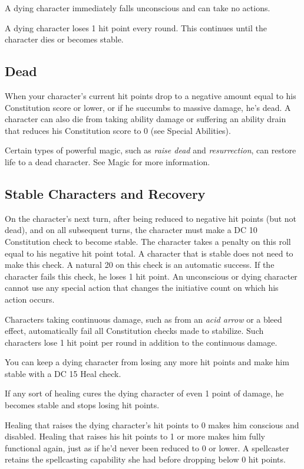 A dying character immediately falls unconscious and can take no actions.
				
A dying character loses 1 hit point every round. This continues until the character dies or becomes stable.
				
\subsection{Dead}

				
When your character's current hit points drop to a negative amount equal to his Constitution score or lower, or if he succumbs to massive damage, he's dead. A character can also die from taking ability damage or suffering an ability drain that reduces his Constitution score to 0 (see Special Abilities).
				
Certain types of powerful magic, such as \textit{raise dead} and \textit{resurrection}, can restore life to a dead character. See Magic for more information.
				
\subsection{Stable Characters and Recovery}

				
On the character's next turn, after being reduced to negative hit points (but not dead), and on all subsequent turns, the character must make a DC 10 Constitution check to become stable. The character takes a penalty on this roll equal to his negative hit point total. A character that is stable does not need to make this check. A natural 20 on this check is an automatic success. If the character fails this check, he loses 1 hit point. An unconscious or dying character cannot use any special action that changes the initiative count on which his action occurs.
				
Characters taking continuous damage, such as from an \textit{acid arrow} or a bleed effect, automatically fail all Constitution checks made to stabilize. Such characters lose 1 hit point per round in addition to the continuous damage. 
				
You can keep a dying character from losing any more hit points and make him stable with a DC 15 Heal check.
				
If any sort of healing cures the dying character of even 1 point of damage, he becomes stable and stops losing hit points.
				
Healing that raises the dying character's hit points to 0 makes him conscious and disabled. Healing that raises his hit points to 1 or more makes him fully functional again, just as if he'd never been reduced to 0 or lower. A spellcaster retains the spellcasting capability she had before dropping below 0 hit points.
				
